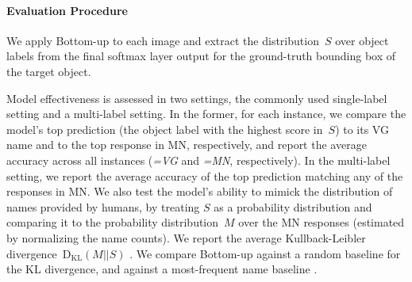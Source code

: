 \paragraph{Evaluation Procedure}
We apply Bottom-up to each image and extract the distribution~$S$ over object labels from the final softmax layer output for the ground-truth bounding box of the target object. 

Model effectiveness is assessed in two settings, the commonly used single-label setting and a multi-label setting. 
In the former, for each instance, we compare the model's top prediction (the object label with the highest score in\ $S$) to its VG name and to the top response in MN, respectively, and report the average accuracy across all instances (\textit{=VG} and \textit{=MN}, respectively).
In the multi-label setting, we report the average accuracy of the top prediction matching any of the responses in MN.
We also test the model's ability to mimick the distribution of names provided by humans, by treating $S$ as a probability distribution and comparing it to the probability distribution~$M$ over the MN responses (estimated by normalizing the name counts). 
We report the average Kullback-Leibler divergence~$\mathrm{D_{KL}}(M||S)$ \cite{kullback1951information}.
We compare Bottom-up against a random baseline for the KL divergence, and against a most-frequent name baseline .

\iffalse
\textsl{top}: the model's top prediction
\begin{itemize}
	\item \textbf{=VG} The average model accuracy of \textsl{top} on the VG names
	\item \textbf{=MN} The average model accuracy of \textsl{top} on the top response in ManyNames
	\item \textbf{$\in$MN} The average model accuracy of \textsl{top} to match any name of the responses in ManyNames
	\item \textbf{KL} The average Kullback-Leibler divergence~$\mathrm{D_{KL}}(M||S)$ of the model's softmax output~$S$ and the  probability distribution~$M$ over ManyNames, estimated by normalizing the name counts per instance
\end{itemize}
\fi

